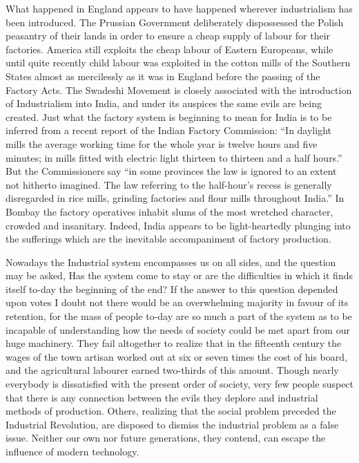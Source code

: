 \documentclass{book}
\begin{document}
What happened in England appears to have happened wherever industrialism has been introduced. The Prussian Government deliberately dispossessed the Polish peasantry of their lands in order to ensure a cheap supply of labour for their factories. America still exploits the cheap labour of Eastern Europeans, while until quite recently child labour was exploited in the cotton mills of the Southern States almost as mercilessly as it was in England before the passing of the Factory Acts. The Swadeshi Movement is closely associated with the introduction of Industrialism into India, and under its auspices the same evils are being created. Just what the factory system is beginning to mean for India is to be inferred from a recent report of the Indian Factory Commission: “In daylight mills the average working time for the whole year is twelve hours and five minutes; in mills fitted with electric light thirteen to thirteen and a half hours.” But the Commissioners say “in some provinces the law is ignored to an extent not hitherto imagined. The law referring to the half-hour’s recess is generally disregarded in rice mills, grinding factories and flour mills throughout India.” In Bombay the factory operatives inhabit slums of the most wretched character, crowded and insanitary. Indeed, India appears to be light-heartedly plunging into the sufferings which are the inevitable accompaniment of factory production.\footnotemark[4]

Nowadays the Industrial system encompasses us on all sides, and the question may be asked, Has the system come to stay or are the difficulties in which it finds itself to-day the beginning of the end? If the answer to this question depended upon votes I doubt not there would be an overwhelming majority in favour of its retention, for the mass of people to-day are so much a part of the system as to be incapable of understanding how the needs of society could be met apart from our huge machinery. They fail altogether to realize that in the fifteenth century the wages of the town artisan worked out at six or seven times the cost of his board, and the agricultural labourer earned two-thirds of this amount. Though nearly everybody is dissatisfied with the present order of society, very few people suspect that there is any connection between the evils they deplore and industrial methods of production. Others, realizing that the social problem preceded the Industrial Revolution, are disposed to dismiss the industrial problem as a false issue. Neither our own nor future generations, they contend, can escape the influence of modern technology.
\end{document}
